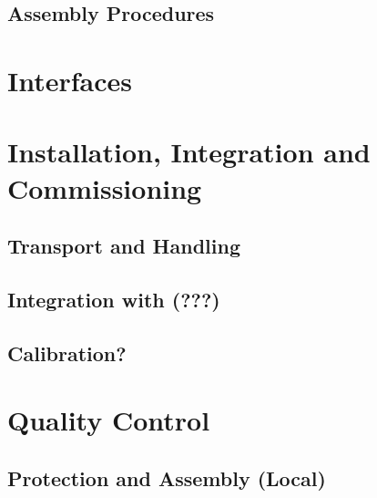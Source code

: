 \subsection{Assembly Procedures}
\label{sec:fdsp-install-assy}



\section{Interfaces}
\label{sec:fdsp-install-intfc}





\section{Installation, Integration and Commissioning}
\label{sec:fdsp-install-install}


\subsection{Transport and Handling}
\label{sec:fdsp-install-install-transport}


\subsection{Integration with (???)}
\label{sec:fdsp-install-install-integ}


\subsection{Calibration?}
\label{sec:fdsp-install-install-calib}



\section{Quality Control}
\label{sec:fdsp-install-qc}

\subsection{Protection and Assembly (Local)}
\label{sec:fdsp-install-qc-local}


